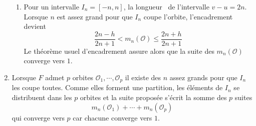 \begin{enumerate}
\begin{enumerate}
 \item Pour un intervalle $I_n= \left[ -n ,n \right]$, la \og longueur\fg~ de l'intervalle $v-u = 2n$. Lorsque $n$ est assez grand pour que $I_n$ coupe l'orbite, l'encadrement devient
\begin{displaymath}
 \frac{2n - h}{2n+1} < m_n(\mathcal{O}) \leq \frac{2n + h}{2n+1}
\end{displaymath}
Le théorème usuel d'encadrement assure alors que la suite des $m_n(\mathcal{O})$ converge vers $1$.
\end{enumerate}

 \item Lorsque $F$ admet $p$ orbites $\mathcal{O}_1, \cdots ,\mathcal{O}_p$ il existe des $n$ assez grands pour que $I_n$ les coupe toutes. Comme elles forment une partition, les éléments de $I_n$ se distribuent dans les $p$ orbites et la suite proposée s'écrit  la somme des $p$ suites
 \begin{displaymath}
  m_n(\mathcal{O}_1)+ \cdots + m_n(\mathcal{O}_p)
 \end{displaymath}
qui converge vers $p$ car chacune converge vers $1$.
\end{enumerate}
